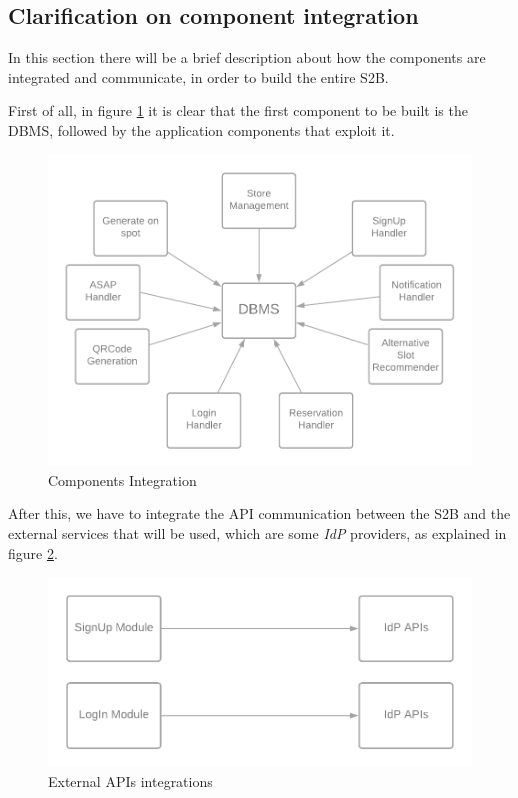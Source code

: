 \documentclass[table, 12pt]{article}
\begin{document}
\subsection{Clarification on component integration}
In this section there will be a brief description about how the components are integrated and communicate, in order to build the entire S2B.

First of all, in figure \ref{components_integration} it is clear that the first component to be built is the DBMS, followed by the application components that exploit it.

\begin{center}
    \begin{figure}[H]
        \includegraphics[width=\textwidth]{assets/IT-Plan/Components-Integration.png}
        \caption{Components Integration}
        \label{components_integration}
    \end{figure}
\end{center}

After this, we have to integrate the API communication between the S2B and the external services that will be used, which are some \textit{IdP} providers, as explained in figure \ref{external_services}.

\begin{center}
    \begin{figure}[H]
        \includegraphics[width=\textwidth]{assets/IT-Plan/External-Services.png}
        \caption{External APIs integrations}
        \label{external_services}
    \end{figure}
\end{center}
\end{document}
